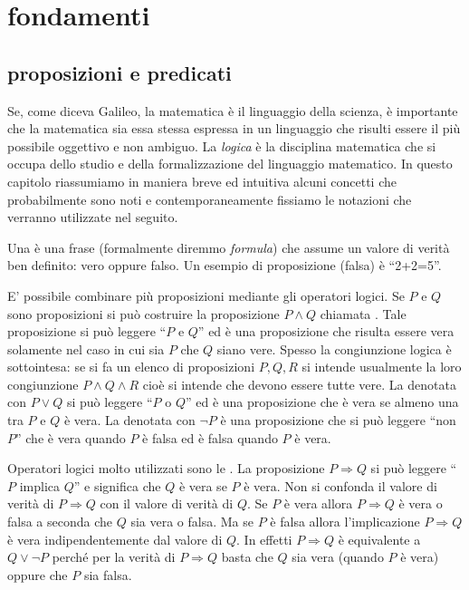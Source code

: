 \chapter{fondamenti}
\section{proposizioni e predicati}

Se, come diceva Galileo, la matematica è il linguaggio della scienza,
è importante che la matematica sia essa stessa espressa in un linguaggio
che risulti essere il più possibile oggettivo e non ambiguo.
La \emph{logica} è la disciplina matematica che si occupa
dello studio e della formalizzazione del linguaggio matematico.
In questo capitolo riassumiamo in maniera breve ed intuitiva
alcuni concetti che probabilmente sono noti e contemporaneamente
fissiamo le notazioni che verranno utilizzate nel seguito.

Una 
è una frase (formalmente diremmo \emph{formula})
che assume un valore di verità ben
definito: vero oppure falso.
Un esempio di proposizione (falsa) è ``2+2=5''.

E' possibile combinare più proposizioni mediante
gli operatori logici. Se $P$ e $Q$ sono proposizioni
si può costruire la proposizione $P \land Q$
chiamata .
Tale proposizione
si può leggere ``$P$ e $Q$'' ed è una proposizione
che risulta essere vera solamente nel caso in cui sia
$P$ che $Q$ siano vere.
Spesso la congiunzione logica è sottointesa:
se si fa un elenco di proposizioni $P,Q,R$ 
si intende usualmente la loro congiunzione $P \land Q \land R$
cioè si intende che devono essere tutte vere.
La  denotata
con $P \lor Q$
si può leggere ``$P$ o $Q$'' ed è una proposizione che
è vera se almeno una tra $P$ e $Q$ è vera.
La  denotata con $\lnot P$ è una
proposizione che si può leggere ``non $P$'' che
è vera quando $P$ è falsa ed è falsa quando $P$ è vera.

Operatori logici molto utilizzati sono le .
La proposizione $P\Rightarrow Q$ si può leggere ``$P$ implica $Q$''
e significa che $Q$ è vera se $P$ è vera. Non si confonda
il valore di verità di $P\Rightarrow Q$ con il valore di verità
di $Q$. Se $P$ è vera allora $P\Rightarrow Q$ è vera o falsa
a seconda che $Q$ sia vera o falsa. Ma se $P$ è falsa allora
l'implicazione $P\Rightarrow Q$ è vera indipendentemente dal
valore di $Q$. In effetti $P\Rightarrow Q$ è equivalente a
$Q \lor \lnot P$ perché per la verità di $P\Rightarrow Q$
basta che $Q$ sia vera (quando $P$ è vera) oppure che $P$ sia falsa.

